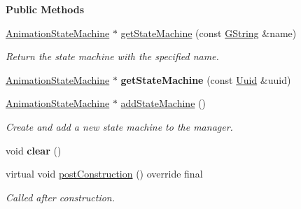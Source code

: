 \begin{Indent}\textbf{ Public Methods}\par
\begin{DoxyCompactItemize}
\item 
\mbox{\label{classrev_1_1_animation_manager_a1c2b783020ec953cf2ad5c08d528d2b1}} 
\mbox{\hyperlink{classrev_1_1_animation_state_machine}{Animation\+State\+Machine}} $\ast$ \mbox{\hyperlink{classrev_1_1_animation_manager_a1c2b783020ec953cf2ad5c08d528d2b1}{get\+State\+Machine}} (const \mbox{\hyperlink{classrev_1_1_g_string}{G\+String}} \&name)
\begin{DoxyCompactList}\small\item\em Return the state machine with the specified name. \end{DoxyCompactList}\item 
\mbox{\label{classrev_1_1_animation_manager_a223671b03d008db7cc3a95c23514abef}} 
\mbox{\hyperlink{classrev_1_1_animation_state_machine}{Animation\+State\+Machine}} $\ast$ {\bfseries get\+State\+Machine} (const \mbox{\hyperlink{classrev_1_1_uuid}{Uuid}} \&uuid)
\item 
\mbox{\label{classrev_1_1_animation_manager_ae83ed0e214745d1473a4697f6b94a0bd}} 
\mbox{\hyperlink{classrev_1_1_animation_state_machine}{Animation\+State\+Machine}} $\ast$ \mbox{\hyperlink{classrev_1_1_animation_manager_ae83ed0e214745d1473a4697f6b94a0bd}{add\+State\+Machine}} ()
\begin{DoxyCompactList}\small\item\em Create and add a new state machine to the manager. \end{DoxyCompactList}\item 
\mbox{\label{classrev_1_1_animation_manager_a4a12cd419b9b91ec381b08decb9b7dab}} 
void {\bfseries clear} ()
\item 
\mbox{\label{classrev_1_1_animation_manager_a13f4d23b154d3ad28022bdcc6f681a58}} 
virtual void \mbox{\hyperlink{classrev_1_1_animation_manager_a13f4d23b154d3ad28022bdcc6f681a58}{post\+Construction}} () override final
\begin{DoxyCompactList}\small\item\em Called after construction. \end{DoxyCompactList}\end{DoxyCompactItemize}
\end{Indent}
